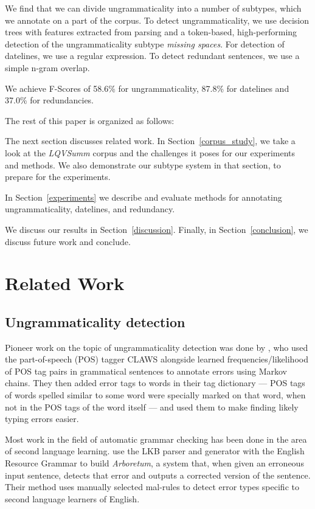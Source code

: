 \documentclass[a4paper,10pt]{scrartcl}
\theoremstyle{style}
\begin{document}
We find that we can divide ungrammaticality into a number of subtypes, which we annotate on a part of the corpus.
To detect ungrammaticality, we use decision trees with features extracted from parsing and a token-based, high-performing detection of the ungrammaticality subtype \textit{missing spaces}.
For detection of datelines, we use a regular expression. To detect redundant sentences, we use a simple n-gram overlap.

We achieve F-Scores of 58.6\% for ungrammaticality, 87.8\% for datelines and 37.0\% for redundancies.

The rest of this paper is organized as follows:

The next section discusses related work. In Section~\ref{corpus_study}, we take a look at the \textit{LQVSumm} corpus and the challenges it poses for our experiments and methods. We also demonstrate our subtype system in that section, to prepare for the experiments.

In Section~\ref{experiments} we describe and evaluate methods for annotating ungrammaticality, datelines, and redundancy.

We discuss our results in Section~\ref{discussion}. Finally, in Section~\ref{conclusion}, we discuss future work and conclude.

\newpage
\section{Related Work}
\label{related_work}

\subsection{Ungrammaticality detection}

Pioneer work on the topic of ungrammaticality detection was done by \cite{atwell1987detect}, who used the part-of-speech (POS) tagger CLAWS \citep{leech1983automatic} alongside learned frequencies/likelihood of POS tag pairs in grammatical sentences to annotate errors using Markov chains.
They then added error tags to words in their tag dictionary --- POS tags of words spelled similar to some word were specially marked on that word, when not in the POS tags of the word itself  --- and used them to make finding likely typing errors easier.

Most work in the field of automatic grammar checking has been done in the area of second language learning.
\cite{bender2004arboretum} use the LKB parser and generator \citep{copestake2002implementing} with the English Resource Grammar \citep{flickinger2000building} to build \textit{Arboretum}, a system that, when given an erroneous input sentence, detects that error and outputs a corrected version of the sentence. Their method uses manually selected mal-rules \citep{schneider1998recognizing} to detect error types specific to second language learners of English.
\end{document}
